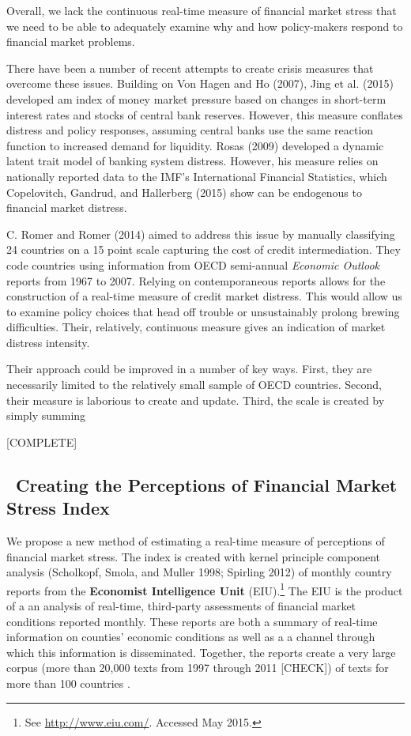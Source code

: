 \documentclass[]{article}
\let\rmarkdownfootnote\footnote%
\def\footnote{\protect\rmarkdownfootnote}
\begin{document}
Overall, we lack the continuous real-time measure of financial market
stress that we need to be able to adequately examine why and how
policy-makers respond to financial market problems.

There have been a number of recent attempts to create crisis measures
that overcome these issues. Building on {Von Hagen} and Ho (2007), Jing
et al. (2015) developed am index of money market pressure based on
changes in short-term interest rates and stocks of central bank
reserves. However, this measure conflates distress and policy responses,
assuming central banks use the same reaction function to increased
demand for liquidity. Rosas (2009) developed a dynamic latent trait
model of banking system distress. However, his measure relies on
nationally reported data to the IMF's International Financial
Statistics, which Copelovitch, Gandrud, and Hallerberg (2015) show can
be endogenous to financial market distress.

C. Romer and Romer (2014) aimed to address this issue by manually
classifying 24 countries on a 15 point scale capturing the cost of
credit intermediation. They code countries using information from OECD
semi-annual \emph{Economic Outlook} reports from 1967 to 2007. Relying
on contemporaneous reports allows for the construction of a real-time
measure of credit market distress. This would allow us to examine policy
choices that head off trouble or unsustainably prolong brewing
difficulties. Their, relatively, continuous measure gives an indication
of market distress intensity.

Their approach could be improved in a number of key ways. First, they
are necessarily limited to the relatively small sample of OECD
countries. Second, their measure is laborious to create and update.
Third, the scale is created by simply summing

{[}COMPLETE{]}

\subsection{~Creating the Perceptions of Financial Market Stress
Index}\label{creating-the-perceptions-of-financial-market-stress-index}

We propose a new method of estimating a real-time measure of perceptions
of financial market stress. The index is created with kernel principle
component analysis (Scholkopf, Smola, and Muller 1998; Spirling 2012) of
monthly country reports from the \textbf{Economist Intelligence Unit}
(EIU).\footnote{See \url{http://www.eiu.com/}. Accessed May 2015.} The
EIU is the product of a an analysis of real-time, third-party
assessments of financial market conditions reported monthly. These
reports are both a summary of real-time information on counties'
economic conditions as well as a a channel through which this
information is disseminated. Together, the reports create a very large
corpus (more than 20,000 texts from 1997 through 2011 {[}CHECK{]}) of
texts for more than 100 countries .
\end{document}
